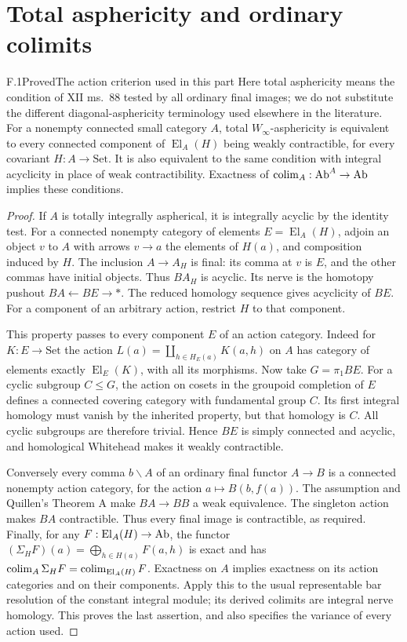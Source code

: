\section{Total asphericity and ordinary colimits}
\begin{claim}{F.1}{Proved}{The action criterion used in this part}
Here total asphericity means the condition of XII ms.~88 tested by all ordinary final images; we do not substitute the different diagonal-asphericity terminology used elsewhere in the literature. For a nonempty connected small category $A$, total $W_\infty$-asphericity is equivalent to every connected component of $\operatorname{El}_A(H)$ being weakly contractible, for every covariant $H:A\to\mathrm{Set}$. It is also equivalent to the same condition with integral acyclicity in place of weak contractibility. Exactness of $\operatorname{colim}_A:\mathrm{Ab}^A\to\mathrm{Ab}$ implies these conditions.
\end{claim}
\begin{proof}
If $A$ is totally integrally aspherical, it is integrally acyclic by the identity test. For a connected nonempty category of elements $E=\operatorname{El}_A(H)$, adjoin an object $v$ to $A$ with arrows $v\to a$ the elements of $H(a)$, and composition induced by $H$. The inclusion $A\to A_H$ is final: its comma at $v$ is $E$, and the other commas have initial objects. Thus $BA_H$ is acyclic. Its nerve is the homotopy pushout $BA\leftarrow BE\to *$. The reduced homology sequence gives acyclicity of $BE$. For a component of an arbitrary action, restrict $H$ to that component.

This property passes to every component $E$ of an action category. Indeed for $K:E\to\mathrm{Set}$ the action $L(a)=\coprod_{h\in H_E(a)}K(a,h)$ on $A$ has category of elements exactly $\operatorname{El}_E(K)$, with all its morphisms. Now take $G=\pi_1BE$. For a cyclic subgroup $C\leq G$, the action on cosets in the groupoid completion of $E$ defines a connected covering category with fundamental group $C$. Its first integral homology must vanish by the inherited property, but that homology is $C$. All cyclic subgroups are therefore trivial. Hence $BE$ is simply connected and acyclic, and homological Whitehead makes it weakly contractible.

Conversely every comma $b\backslash A$ of an ordinary final functor $A\to B$ is a connected nonempty action category, for the action $a\mapsto B(b,f(a))$. The assumption and Quillen's Theorem A make $BA\to BB$ a weak equivalence. The singleton action makes $BA$ contractible. Thus every final image is contractible, as required.
Finally, for any $F:\operatorname{El}_A(H)\to\mathrm{Ab}$, the functor
$(\Sigma_HF)(a)=\bigoplus_{h\in H(a)}F(a,h)$ is exact and has
$\operatorname{colim}_A\Sigma_HF=\operatorname{colim}_{\operatorname{El}_A(H)}F$.
Exactness on $A$ implies exactness on its action categories and on their components. Apply this to the usual representable bar resolution of the constant integral module; its derived colimits are integral nerve homology. This proves the last assertion, and also specifies the variance of every action used.
\end{proof}

